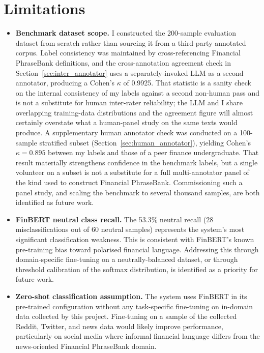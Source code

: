 \section{Limitations}
\label{sec:eval_limitations}

\begin{itemize}
    \item \textbf{Benchmark dataset scope.}  I constructed the 200-sample evaluation dataset from scratch rather than sourcing it from a third-party annotated corpus.  Label consistency was maintained by cross-referencing Financial PhraseBank \citep{malo2014financialphrasebank} definitions, and the cross-annotation agreement check in Section~\ref{sec:inter_annotator} uses a separately-invoked LLM as a second annotator, producing a Cohen's $\kappa$ of 0.9925. That statistic is a sanity check on the internal consistency of my labels against a second non-human pass and is not a substitute for human inter-rater reliability; the LLM and I share overlapping training-data distributions and the agreement figure will almost certainly overstate what a human-panel study on the same texts would produce. A supplementary human annotator check was conducted on a 100-sample stratified subset (Section~\ref{sec:human_annotator}), yielding Cohen's $\kappa = 0.895$ between my labels and those of a peer finance undergraduate. That result materially strengthens confidence in the benchmark labels, but a single volunteer on a subset is not a substitute for a full multi-annotator panel of the kind used to construct Financial PhraseBank. Commissioning such a panel study, and scaling the benchmark to several thousand samples, are both identified as future work.

    \item \textbf{FinBERT neutral class recall.}  The 53.3\% neutral recall (28 misclassifications out of 60 neutral samples) represents the system's most significant classification weakness.  This is consistent with FinBERT's known pre-training bias toward polarised financial language.  Addressing this through domain-specific fine-tuning on a neutrally-balanced dataset, or through threshold calibration of the softmax distribution, is identified as a priority for future work.

    \item \textbf{Zero-shot classification assumption.}  The system uses FinBERT in its pre-trained configuration without any task-specific fine-tuning on in-domain data collected by this project.  Fine-tuning on a sample of the collected Reddit, Twitter, and news data would likely improve performance, particularly on social media where informal financial language differs from the news-oriented Financial PhraseBank domain.


\end{itemize}
